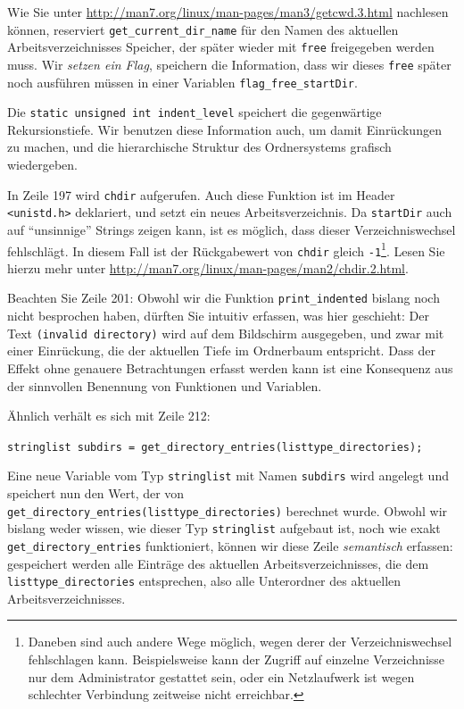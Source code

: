 Wie Sie unter \url{http://man7.org/linux/man-pages/man3/getcwd.3.html} nachlesen können, reserviert \texttt{get\_current\_dir\_name} für den Namen des aktuellen Arbeitsverzeichnisses Speicher, der später wieder mit \texttt{free} freigegeben werden muss. Wir \emph{setzen ein Flag}, \ie speichern die Information, dass wir dieses \texttt{free} später noch ausführen müssen in einer Variablen \texttt{flag\_free\_startDir}.

Die \texttt{static unsigned int indent_level} speichert die gegenwärtige Rekursionstiefe. Wir benutzen diese Information auch, um damit Einrückungen zu machen, und die hierarchische Struktur des Ordnersystems grafisch wiedergeben.

In Zeile 197 wird \texttt{chdir} aufgerufen. Auch diese Funktion ist im Header \texttt{<unistd.h>} deklariert, und setzt ein neues Arbeitsverzeichnis. Da \texttt{startDir} auch auf \enquote{unsinnige} Strings zeigen kann, ist es möglich, dass dieser Verzeichniswechsel fehlschlägt. In diesem Fall ist der Rückgabewert von \texttt{chdir} gleich \texttt{-1}\footnote{Daneben sind auch andere Wege möglich, wegen derer der Verzeichniswechsel fehlschlagen kann. Beispielsweise kann der Zugriff auf einzelne Verzeichnisse nur dem Administrator gestattet sein, oder ein Netzlaufwerk ist wegen schlechter Verbindung zeitweise nicht erreichbar.}.
Lesen Sie hierzu mehr unter \url{http://man7.org/linux/man-pages/man2/chdir.2.html}.

Beachten Sie Zeile 201: Obwohl wir die Funktion \texttt{print\_indented} bislang noch nicht besprochen haben, dürften Sie intuitiv erfassen, was hier geschieht: Der Text \texttt{(invalid directory)} wird auf dem Bildschirm ausgegeben, und zwar mit einer Einrückung, die der aktuellen Tiefe im Ordnerbaum entspricht. Dass der Effekt ohne genauere Betrachtungen erfasst werden kann ist eine Konsequenz aus der sinnvollen Benennung von Funktionen und Variablen.

Ähnlich verhält es sich mit Zeile 212:
\begin{center}
\texttt{stringlist subdirs = get_directory_entries(listtype_directories);}
\end{center}
Eine neue Variable vom Typ \texttt{stringlist} mit Namen \texttt{subdirs} wird angelegt und speichert nun den Wert, der von \texttt{get\_directory\_entries(listtype\_directories)} berechnet wurde. Obwohl wir bislang weder wissen, wie dieser Typ \texttt{stringlist} aufgebaut ist, noch wie exakt 
\texttt{get\_directory\_entries} funktioniert, können wir diese Zeile \emph{semantisch} erfassen: gespeichert werden alle Einträge des aktuellen Arbeitsverzeichnisses, die dem 
\texttt{listtype\_directories} entsprechen, also alle Unterordner des aktuellen Arbeitsverzeichnisses.

